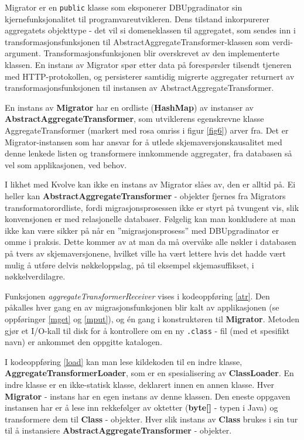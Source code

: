 

Migrator er en \texttt{public} klasse som eksponerer DBUpgradinator sin kjernefunksjonalitet til programvareutvikleren. Dens tilstand inkorpurerer aggregatets objekttype - det vil si domeneklassen til aggregatet, som sendes inn i transformasjonsfunksjonen til Abstract\-AggregateTransformer-klassen som verdi-argument. Transformasjonsfunksjonen blir overskrevet av den implementerte klassen. En instans av Migrator spør etter data på forespørsler tilsendt tjeneren med HTTP-protokollen, og persisterer samtidig migrerte aggregater returnert av transformasjonsfunksjonen til instansen av AbstractAggregateTransformer.

En instans av \textbf{Migrator} har en ordliste (\textbf{HashMap}) av instanser av \textbf{AbstractAggregateTransformer}, som utviklerens egenskrevne klasse AggregateTransformer (markert med rosa omriss i figur \ref{fig6}) arver fra. Det er Migrator-instansen som har ansvar for å utlede skjemaversjonskausalitet med denne lenkede listen og transformere innkommende aggregater, fra databasen så vel som applikasjonen, ved behov.

I likhet med Kvolve kan ikke en instans av Migrator slåes av, den er alltid på. Ei heller kan \textbf{AbstractAggregateTransformer} - objekter fjernes fra Migrators transformator\-ordliste, fordi migrasjonsprosessen ikke er styrt på tvungent vis, slik konvensjonen er med relasjonelle databaser. Følgelig kan man konkludere at man ikke kan være sikker på når en ''migrasjonsprosess'' med DBUpgradinator er omme i praksis. Dette kommer av at man da må overvåke alle nøkler i databasen på tvers av skjemaversjonene, hvilket ville ha vært lettere hvis det hadde vært mulig å utføre delvis nøkkeloppslag, på til eksempel skjemasuffikset, i nøkkelverdi\-lagre.



Funksjonen \emph{aggregateTransformerReceiver} vises i kodeoppføring \ref{atr}. Den påkalles hver gang en av migrasjonsfunksjonen blir kalt av applikasjonen (se oppføringer \ref{mget} og \ref{mput}), og én gang i konstruktøren til \textbf{Migrator}. Metoden gjør et I/O-kall til disk for å kontrollere om en ny \texttt{.class} - fil (med et spesifikt navn) er ankommet den oppgitte katalogen.



I kodeoppføring \ref{load} kan man lese kildekoden til en indre klasse, \textbf{AggregateTransformerLoader}, som er en spesialisering av \textbf{ClassLoader}. En indre klasse er en ikke-statisk klasse, deklarert innen en annen klasse. Hver \textbf{Migrator} - instans har en egen instans av denne klassen. Den eneste oppgaven instansen har er å lese inn rekkefølger av oktetter (\textbf{byte[]} - typen i Java) og transformere dem til \textbf{Class} - objekter. Hver slik instans av \textbf{Class} brukes i sin tur til å instansiere \textbf{AbstractAggregateTransformer} - objekter.

